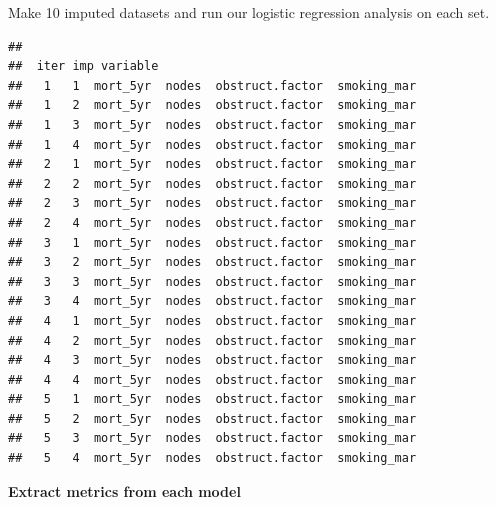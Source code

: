 \documentclass[
  12pt,
  krantz2]{krantz}
\makeatletter
\newenvironment{Shaded}{\begin{snugshade}}{\end{snugshade}}
\newcommand{\CommentTok}[1]{\textcolor[rgb]{0.56,0.35,0.01}{\textit{#1}}}
\newcommand{\DataTypeTok}[1]{\textcolor[rgb]{0.13,0.29,0.53}{#1}}
\newcommand{\DecValTok}[1]{\textcolor[rgb]{0.00,0.00,0.81}{#1}}
\newcommand{\KeywordTok}[1]{\textcolor[rgb]{0.13,0.29,0.53}{\textbf{#1}}}
\newcommand{\NormalTok}[1]{#1}
\newcommand{\OperatorTok}[1]{\textcolor[rgb]{0.81,0.36,0.00}{\textbf{#1}}}
\newcommand{\StringTok}[1]{\textcolor[rgb]{0.31,0.60,0.02}{#1}}
\newenvironment{kframe}{%
\medskip{}
\setlength{\fboxsep}{.8em}
 \def\at@end@of@kframe{}%
 \ifinner\ifhmode%
  \def\at@end@of@kframe{\end{minipage}}%
  \begin{minipage}{\columnwidth}%
 \fi\fi%
 \def\FrameCommand##1{\hskip\@totalleftmargin \hskip-\fboxsep
 \colorbox{shadecolor}{##1}\hskip-\fboxsep
     \hskip-\linewidth \hskip-\@totalleftmargin \hskip\columnwidth}%
 \MakeFramed {\advance\hsize-\width
   \@totalleftmargin\z@ \linewidth\hsize
   \@setminipage}}%
 {\par\unskip\endMakeFramed%
 \at@end@of@kframe}
\renewenvironment{Shaded}{\begin{kframe}}{\end{kframe}}
\makeatother
\begin{document}
Make 10 imputed datasets and run our logistic regression analysis on each set.

\begin{Shaded}
\end{Shaded}

\begin{verbatim}
## 
##  iter imp variable
##   1   1  mort_5yr  nodes  obstruct.factor  smoking_mar
##   1   2  mort_5yr  nodes  obstruct.factor  smoking_mar
##   1   3  mort_5yr  nodes  obstruct.factor  smoking_mar
##   1   4  mort_5yr  nodes  obstruct.factor  smoking_mar
##   2   1  mort_5yr  nodes  obstruct.factor  smoking_mar
##   2   2  mort_5yr  nodes  obstruct.factor  smoking_mar
##   2   3  mort_5yr  nodes  obstruct.factor  smoking_mar
##   2   4  mort_5yr  nodes  obstruct.factor  smoking_mar
##   3   1  mort_5yr  nodes  obstruct.factor  smoking_mar
##   3   2  mort_5yr  nodes  obstruct.factor  smoking_mar
##   3   3  mort_5yr  nodes  obstruct.factor  smoking_mar
##   3   4  mort_5yr  nodes  obstruct.factor  smoking_mar
##   4   1  mort_5yr  nodes  obstruct.factor  smoking_mar
##   4   2  mort_5yr  nodes  obstruct.factor  smoking_mar
##   4   3  mort_5yr  nodes  obstruct.factor  smoking_mar
##   4   4  mort_5yr  nodes  obstruct.factor  smoking_mar
##   5   1  mort_5yr  nodes  obstruct.factor  smoking_mar
##   5   2  mort_5yr  nodes  obstruct.factor  smoking_mar
##   5   3  mort_5yr  nodes  obstruct.factor  smoking_mar
##   5   4  mort_5yr  nodes  obstruct.factor  smoking_mar
\end{verbatim}

\textbf{Extract metrics from each model}
\end{document}
